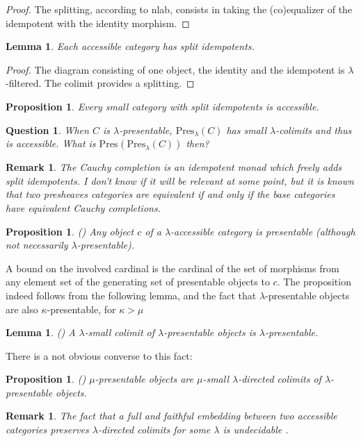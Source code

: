 \documentclass{article}
\newcommand{\Pres}[1]{\text{Pres}_{#1}}
\newtheorem{proposition}[theorem]{Proposition}
\newtheorem{question}[theorem]{Question}
\newtheorem{remark}[theorem]{Remark}
\newtheorem{lemma}[theorem]{Lemma}
\begin{document}
\begin{proof}
 The splitting, according to nlab, consists in taking the (co)equalizer of the
 idempotent with the identity morphism.
\end{proof}
\begin{lemma}
  \cite[2.4]{adamek_rosicky}
  Each accessible category has split idempotents. 
\end{lemma}
\begin{proof}
 The diagram consisting of one object, the identity and the idempotent is
 $\lambda$-filtered. The colimit provides a splitting.
\end{proof}
\begin{proposition}
  \cite[2.6]{adamek_rosicky}
  Every small category with split idempotents is accessible. 
\end{proposition}
\begin{question}
  When $C$ is $\lambda$-presentable,
 $\Pres\lambda(C)$ has small $\lambda$-colimits and thus is accessible.
 What is $\Pres{}(\Pres\lambda(C))$ then?
\end{question}
\begin{remark}
  The Cauchy completion is an idempotent monad which freely adds split idempotents.
  I don't know if it will be relevant at some point, but it is known that
 two presheaves categories are equivalent if and only if the base categories have equivalent
 Cauchy completions.
\end{remark}


\begin{proposition}
  (\cite[Remarks 2.2, (3)]{adamek_rosicky})
  Any object $c$ of a $\lambda$-accessible category is presentable
  (although not necessarily $\lambda$-presentable).
\end{proposition}
A bound on the involved cardinal is the cardinal of the set of morphisms from any
element set of the generating set of presentable objects to $c$.
The proposition indeed follows from the following lemma, and the fact that $\lambda$-presentable
objects are also $\kappa$-presentable, for $\kappa>\mu$
\begin{lemma}
  (\cite[1.16]{adamek_rosicky})
 A $\lambda$-small colimit of $\lambda$-presentable objects is $\lambda$-presentable.
\end{lemma}
There is a not obvious converse to this fact:
\begin{proposition}
  (\cite[Proposition 2.3.11]{accessible})
  $\mu$-presentable objects are $\mu$-small $\lambda$-directed colimits of
  $\lambda$-presentable objects.
\end{proposition}
\begin{remark}
 The fact that a full and faithful embedding between two accessible categories preserves
 $\lambda$-directed colimits for some $\lambda$ is undecidable \cite[2.17.(3)]{adamek_rosicky}.
\end{remark}
\end{document}
